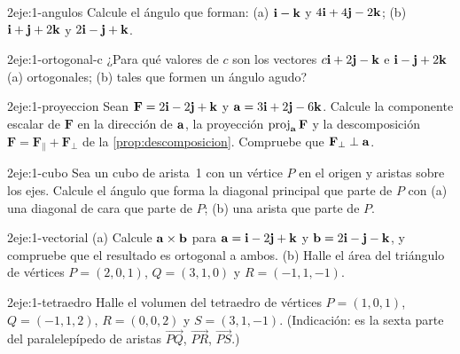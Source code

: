 \begin{ejercicio}{2}{eje:1-angulos}
Calcule el ángulo que forman: (a) $\mathbf{i}-\mathbf{k}$ y $4\mathbf{i}+4\mathbf{j}-2\mathbf{k}$; (b) $\mathbf{i}+\mathbf{j}+2\mathbf{k}$ y $2\mathbf{i}-\mathbf{j}+\mathbf{k}$.
\end{ejercicio}

\begin{ejercicio}{2}{eje:1-ortogonal-c}
¿Para qué valores de $c$ son los vectores $c\mathbf{i}+2\mathbf{j}-\mathbf{k}$ e $\mathbf{i}-\mathbf{j}+2\mathbf{k}$ (a) ortogonales; (b) tales que formen un ángulo agudo?
\end{ejercicio}

\begin{ejercicio}{2}{eje:1-proyeccion}
Sean $\mathbf F=2\mathbf{i}-2\mathbf{j}+\mathbf{k}$ y $\mathbf{a}=3\mathbf{i}+2\mathbf{j}-6\mathbf{k}$. Calcule la componente escalar de $\mathbf F$ en la dirección de $\mathbf{a}$, la proyección $\operatorname{proj}_{\mathbf{a}}\mathbf F$ y la descomposición $\mathbf F=\mathbf F_\parallel+\mathbf F_\perp$ de la \cref{prop:descomposicion}. Compruebe que $\mathbf F_\perp\perp\mathbf{a}$.
\end{ejercicio}

\begin{ejercicio}{2}{eje:1-cubo}
Sea un cubo de arista~1 con un vértice $P$ en el origen y aristas sobre los ejes. Calcule el ángulo que forma la diagonal principal que parte de $P$ con (a) una diagonal de cara que parte de $P$; (b) una arista que parte de $P$.
\end{ejercicio}

\begin{ejercicio}{2}{eje:1-vectorial}
(a) Calcule $\mathbf{a}\times\mathbf{b}$ para $\mathbf{a}=\mathbf{i}-2\mathbf{j}+\mathbf{k}$ y $\mathbf{b}=2\mathbf{i}-\mathbf{j}-\mathbf{k}$, y compruebe que el resultado es ortogonal a ambos. (b) Halle el área del triángulo de vértices $P=(2,0,1)$, $Q=(3,1,0)$ y $R=(-1,1,-1)$.
\end{ejercicio}

\begin{ejercicio}{2}{eje:1-tetraedro}
Halle el volumen del tetraedro de vértices $P=(1,0,1)$, $Q=(-1,1,2)$, $R=(0,0,2)$ y $S=(3,1,-1)$. (Indicación: es la sexta parte del paralelepípedo de aristas $\overrightarrow{PQ}$, $\overrightarrow{PR}$, $\overrightarrow{PS}$.)
\end{ejercicio}

